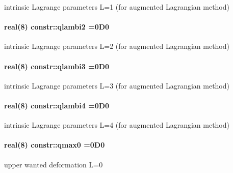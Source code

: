 intrinsic Lagrange parameters L=1 (for augmented Lagrangian method) 

\paragraph[{\texorpdfstring{qlambi2}{qlambi2}}]{\setlength{\rightskip}{0pt plus 5cm}real(8) constr\+::qlambi2 =0\+D0}\hypertarget{namespaceconstr_abdf9acb351b618a77f3c43b98a9b283e}{}\label{namespaceconstr_abdf9acb351b618a77f3c43b98a9b283e}


intrinsic Lagrange parameters L=2 (for augmented Lagrangian method) 

\paragraph[{\texorpdfstring{qlambi3}{qlambi3}}]{\setlength{\rightskip}{0pt plus 5cm}real(8) constr\+::qlambi3 =0\+D0}\hypertarget{namespaceconstr_a4a0d15f8f8e83f0b7dd528b860449684}{}\label{namespaceconstr_a4a0d15f8f8e83f0b7dd528b860449684}


intrinsic Lagrange parameters L=3 (for augmented Lagrangian method) 

\paragraph[{\texorpdfstring{qlambi4}{qlambi4}}]{\setlength{\rightskip}{0pt plus 5cm}real(8) constr\+::qlambi4 =0\+D0}\hypertarget{namespaceconstr_a64a62a693071f3fa8bd0f3c3f59bf7df}{}\label{namespaceconstr_a64a62a693071f3fa8bd0f3c3f59bf7df}


intrinsic Lagrange parameters L=4 (for augmented Lagrangian method) 

\paragraph[{\texorpdfstring{qmax0}{qmax0}}]{\setlength{\rightskip}{0pt plus 5cm}real(8) constr\+::qmax0 =0\+D0}\hypertarget{namespaceconstr_aadabc5bc09c3392f9c3270c23730c058}{}\label{namespaceconstr_aadabc5bc09c3392f9c3270c23730c058}


upper wanted deformation L=0 

